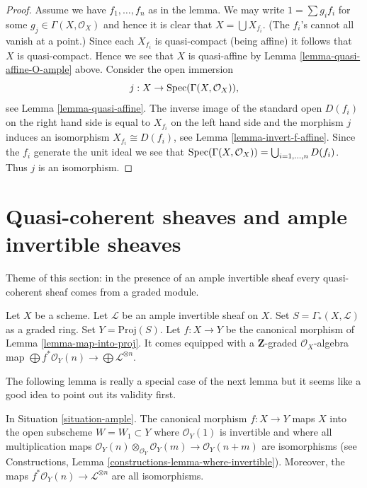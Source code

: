 \begin{proof}
Assume we have $f_1, \ldots, f_n$ as in the lemma.
We may write $1 = \sum g_i f_i$ for some $g_j \in \Gamma(X, \mathcal{O}_X)$
and hence it is clear that $X = \bigcup X_{f_i}$. (The $f_i$'s cannot
all vanish at a point.) Since each $X_{f_i}$
is quasi-compact (being affine) it follows that $X$ is quasi-compact.
Hence we see that $X$ is quasi-affine by
Lemma \ref{lemma-quasi-affine-O-ample} above.
Consider the open immersion
$$
j : X \to \mathop{\mathrm{Spec}}(\Gamma(X, \mathcal{O}_X)),
$$
see Lemma \ref{lemma-quasi-affine}. The inverse image of the standard open
$D(f_i)$ on the right hand side is equal to $X_{f_i}$ on the
left hand side and the morphism $j$ induces an isomorphism
$X_{f_i} \cong D(f_i)$, see
Lemma \ref{lemma-invert-f-affine}. Since the $f_i$ generate the unit ideal
we see that $\mathop{\mathrm{Spec}}(\Gamma(X, \mathcal{O}_X))
= \bigcup_{i = 1, \ldots, n} D(f_i)$. Thus $j$ is an isomorphism.
\end{proof}







\section{Quasi-coherent sheaves and ample invertible sheaves}
\label{section-ample-quasi-coherent}

\noindent
Theme of this section: in the presence of an ample invertible sheaf
every quasi-coherent sheaf comes from a graded module.

\begin{situation}
\label{situation-ample}
Let $X$ be a scheme.
Let $\mathcal{L}$ be an ample invertible sheaf on $X$.
Set $S = \Gamma_*(X, \mathcal{L})$ as a graded ring.
Set $Y = \text{Proj}(S)$.
Let $f : X \to Y$ be the canonical morphism of Lemma \ref{lemma-map-into-proj}.
It comes equipped with a $\mathbf{Z}$-graded $\mathcal{O}_X$-algebra map
$\bigoplus f^*\mathcal{O}_Y(n) \to \bigoplus \mathcal{L}^{\otimes n}$.
\end{situation}

\noindent
The following lemma is really a special case of the next lemma
but it seems like a good idea to point out its validity first.

\begin{lemma}
\label{lemma-ample-gcd-is-one}
In Situation \ref{situation-ample}.
The canonical morphism $f : X \to Y$
maps $X$ into the open subscheme $W = W_1 \subset Y$
where $\mathcal{O}_Y(1)$ is invertible and where
all multiplication maps
$\mathcal{O}_Y(n) \otimes_{\mathcal{O}_Y} \mathcal{O}_Y(m) \to
\mathcal{O}_Y(n + m)$
are isomorphisms (see
Constructions, Lemma \ref{constructions-lemma-where-invertible}).
Moreover, the maps $f^*\mathcal{O}_Y(n) \to \mathcal{L}^{\otimes n}$
are all isomorphisms.
\end{lemma}

